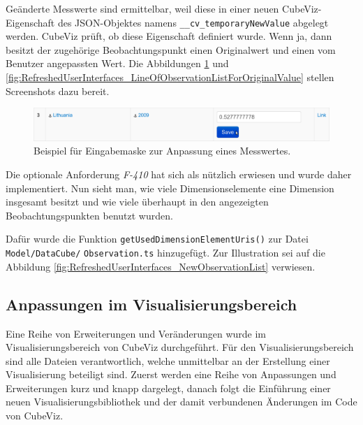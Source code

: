 \documentclass[11pt]{article}
\newcommand{\com}[1]{\marginpar{\em {\small{#1}}}} %
\begin{document}
\noindent
Geänderte Messwerte sind ermittelbar, weil diese in einer neuen CubeViz-Eigenschaft des JSON-Objektes namens \verb|__cv_temporaryNewValue| abgelegt werden. CubeViz prüft, ob diese Eigenschaft definiert wurde. Wenn ja, dann besitzt der zugehörige Beobachtungspunkt einen Originalwert und einen vom Benutzer angepassten Wert. Die Abbildungen \ref{fig:RefreshedUserInterfaces_LineOfObservationListForValueAdaption} und   \ref{fig:RefreshedUserInterfaces_LineOfObservationListForOriginalValue} stellen Screenshots dazu bereit. \\

%
%
\begin{figure}[h!]
    \centering
    \includegraphics[width=15cm]{RefreshedUserInterfaces/LineOfObservationListForValueAdaption.pdf}
    \caption{Beispiel für Eingabemaske zur Anpassung eines Messwertes.}
    \label{fig:RefreshedUserInterfaces_LineOfObservationListForValueAdaption}
\end{figure}

\noindent
Die optionale Anforderung \textit{F-410}\com{Anforderung \\ F-410, S. \pageref{req:F410}} hat sich als nützlich erwiesen und wurde daher implementiert. Nun sieht man, wie viele Dimensionselemente eine Dimension insgesamt besitzt und wie viele überhaupt in den angezeigten Beobachtungspunkten benutzt wurden. 

\newpage
\noindent
Dafür wurde die Funktion\com{Commit \\c08a21} \verb|getUsedDimensionElementUris()| zur Datei \verb|Model/DataCube/| \verb|Observation.ts| hinzugefügt. Zur Illustration sei auf die Abbildung \ref{fig:RefreshedUserInterfaces_NewObservationList} verwiesen.


%
%
\subsection{Anpassungen im Visualisierungsbereich}
\label{sec:chapterVisualizationAdaptions}

Eine Reihe von Erweiterungen und Veränderungen wurde im Visualisierungsbereich von CubeViz durchgeführt. Für den Visualisierungsbereich sind alle Dateien verantwortlich, welche unmittelbar an der Erstellung einer Visualisierung beteiligt sind. Zuerst werden eine Reihe von Anpassungen und Erweiterungen kurz und knapp dargelegt, danach folgt die Einführung einer neuen Visualisierungsbibliothek und der damit verbundenen Änderungen im Code von CubeViz.
\end{document}
